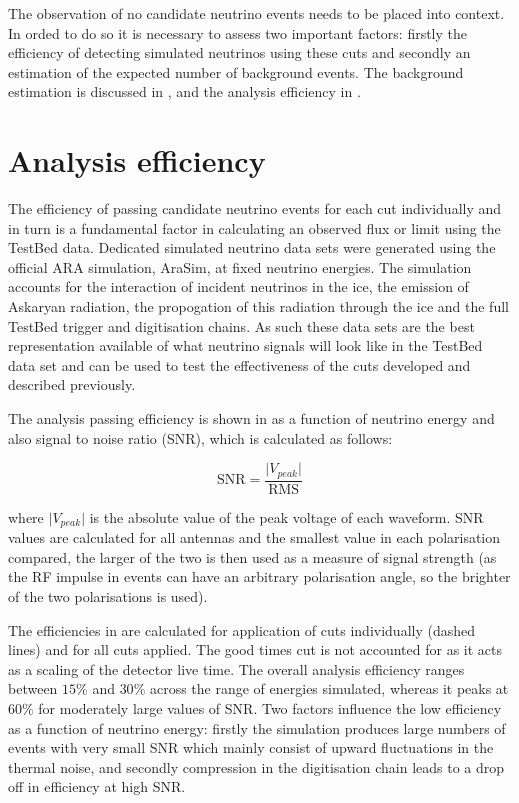 The observation of no candidate neutrino events needs to be placed into context. In orded to do so it is necessary to assess two important factors: firstly the efficiency of detecting simulated neutrinos using these cuts and secondly an estimation of the expected number of background events. The background estimation is discussed in , and the analysis efficiency in .


\section{Analysis efficiency}
\label{sec:Analysis:Efficiency}

The efficiency of passing candidate neutrino events for each cut individually and in turn is a fundamental factor in calculating an observed flux or limit using the TestBed data. Dedicated simulated neutrino data sets were generated using the official ARA simulation, AraSim, at fixed neutrino energies. The simulation accounts for the interaction of incident neutrinos in the ice, the emission of Askaryan radiation, the propogation of this radiation through the ice and the full TestBed trigger and digitisation chains. As such these data sets are the best representation available of what neutrino signals will look like in the TestBed data set and can be used to test the effectiveness of the cuts developed and described previously.

The analysis passing efficiency is shown in  as a function of neutrino energy and also signal to noise ratio (SNR), which is calculated as follows:

\begin{equation}
  \mbox{SNR} = \frac{\lvert V_{peak} \rvert}{\mbox{RMS}}
\end{equation}

\noindent where $\lvert V_{peak} \rvert$ is the absolute value of the peak voltage of each waveform. SNR values are calculated for all antennas and the smallest value in each polarisation compared, the larger of the two is then used as a measure of signal strength (as the RF impulse in events can have an arbitrary polarisation angle, so the brighter of the two polarisations is used).

The efficiencies in  are calculated for application of cuts individually (dashed lines) and for all cuts applied. The good times cut is not accounted for as it acts as a scaling of the detector live time. The overall analysis efficiency ranges between $15 \%$ and $30 \%$ across the range of energies simulated, whereas it peaks at $60 \%$ for moderately large values of SNR. Two factors influence the low efficiency as a function of neutrino energy: firstly the simulation produces large numbers of events with very small SNR which mainly consist of upward fluctuations in the thermal noise, and secondly compression in the digitisation chain leads to a drop off in efficiency at high SNR. 

